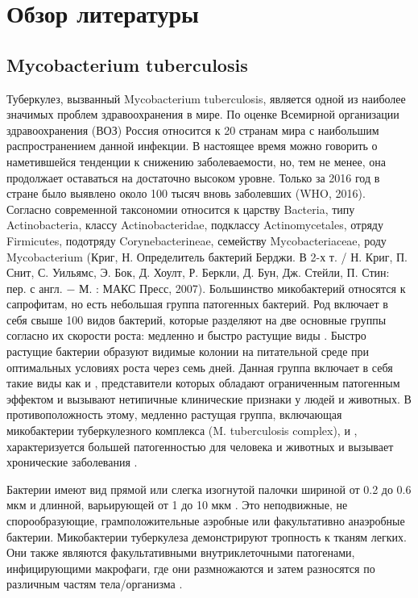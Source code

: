 \section{Обзор литературы}

\subsection{Mycobacterium tuberculosis}
Туберкулез, вызванный Mycobacterium tuberculosis, является одной из наиболее значимых проблем здравоохранения в мире. По оценке Всемирной организации здравоохранения (ВОЗ) Россия относится к 20 странам мира с наибольшим распространением данной инфекции. В настоящее время можно говорить о наметившейся тенденции к снижению заболеваемости, но, тем не менее, она продолжает оставаться на достаточно высоком уровне. Только за 2016 год в стране было выявлено около 100 тысяч вновь заболевших (WHO, 2016). Согласно современной таксономии  относится к царству Bacteria, типу Actinobacteria, классу Actinobacteridae, подклассу Actinomycetales, отряду Firmicutes, подотряду Corynebacterineae, семейству Mycobacteriaceae, роду Mycobacterium (Криг, Н. Определитель бактерий Берджи. В 2-х т. / Н. Криг, П. Снит, С. Уильямс, Э. Бок, Д. Хоулт, Р. Беркли, Д. Бун, Дж. Стейли, П. Стин: пер. с англ. − М. : МАКС Пресс, 2007). Большинство микобактерий относятся к сапрофитам, но есть небольшая группа патогенных бактерий. Род включает в себя свыше 100 видов бактерий, которые разделяют на две основные группы согласно их скорости роста: медленно и быстро растущие виды \cite{godreuil2007first}. Быстро растущие бактерии образуют видимые колонии на питательной среде при оптимальных условиях роста через семь дней. Данная группа включает в себя такие виды как  и , представители которых обладают ограниченным патогенным эффектом и вызывают нетипичные клинические признаки у людей и животных. В противоположность этому, медленно растущая группа, включающая микобактерии туберкулезного комплекса (M. tuberculosis complex),  и , характеризуется большей патогенностью для человека и животных и вызывает хронические заболевания \cite{godreuil2007first}.

Бактерии  имеют вид прямой или слегка изогнутой палочки шириной от 0.2 до 0.6 мкм и длинной, варьирующей от 1 до 10 мкм \cite{godreuil2007first}. Это неподвижные, не спорообразующие, грамположительные аэробные или факультативно анаэробные бактерии. Микобактерии туберкулеза демонстрируют тропность к тканям легких. Они также являются факультативными внутриклеточными патогенами, инфицирующими макрофаги, где они размножаются и затем разносятся по различным частям тела/организма \cite{van2001molecular}. 


